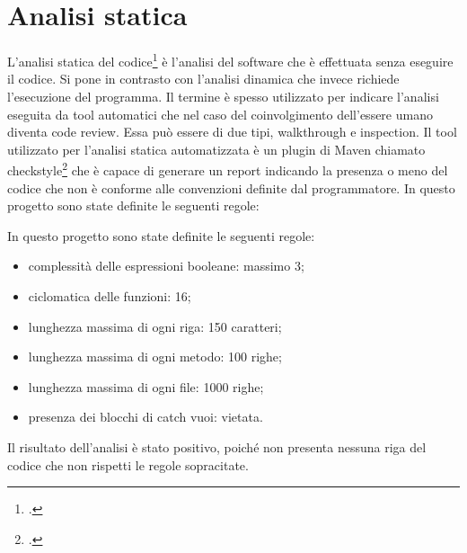 \section{Analisi statica}\label{sec:analisi-statica}

L’analisi statica del codice\footcite{site:analisi_static} è l’analisi del software che è effettuata senza eseguire
il codice.
Si pone in contrasto con l’analisi dinamica che invece richiede l’esecuzione del
programma.
Il termine è spesso utilizzato per indicare l’analisi eseguita da tool
automatici che nel caso del coinvolgimento dell’essere umano diventa code review.
Essa può  essere di due tipi, \gls{walkthrough} e \gls{inspection}.
Il tool utilizzato per l’analisi statica automatizzata è un plugin di Maven
chiamato checkstyle\footcite{site:checkstyle} che è capace di generare un report indicando la presenza o
meno del codice che non è conforme alle convenzioni definite dal programmatore.
In questo progetto sono state definite le seguenti regole:

In questo progetto sono state definite le seguenti regole:
\begin{itemize}
    \item complessità delle espressioni booleane: massimo 3;
    \item \gls{ciclomatica} delle funzioni: 16;
    \item lunghezza massima di ogni riga: 150 caratteri;
    \item lunghezza massima di ogni metodo: 100 righe;
    \item lunghezza massima di ogni file: 1000 righe;
    \item presenza dei blocchi di catch vuoi: vietata.
\end{itemize}

Il risultato dell'analisi è stato positivo, poiché non presenta nessuna riga del codice che non rispetti le regole sopracitate.